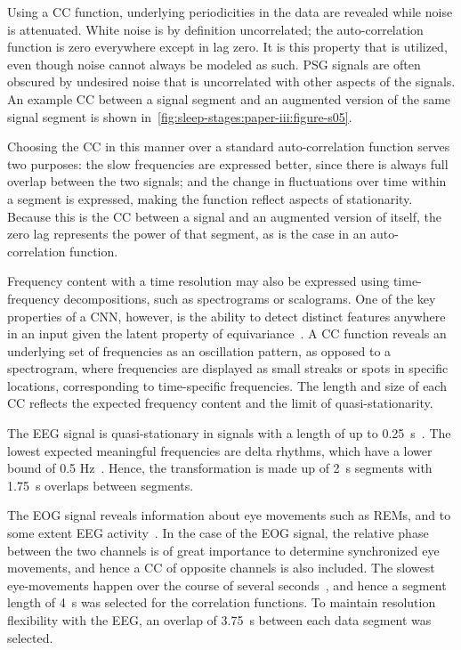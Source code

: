 Using a \ac{CC} function, underlying periodicities in the data are revealed while noise is attenuated. 
White noise is by definition uncorrelated; the auto-correlation function is zero everywhere except in lag zero. 
It is this property that is utilized, even though noise cannot always be modeled as such. 
\ac{PSG} signals are often obscured by undesired noise that is uncorrelated with other aspects of the signals. 
An example \ac{CC} between a signal segment and an augmented version of the same signal segment is shown in~\cref{fig:sleep-stages:paper-iii:figure-s05}. 

Choosing the \ac{CC} in this manner over a standard auto-correlation function serves two purposes: the slow frequencies are expressed better, since there is always full overlap between the two signals; and the change in fluctuations over time within a segment is expressed, making the function reflect aspects of stationarity. 
Because this is the \ac{CC} between a signal and an augmented version of itself, the zero lag represents the power of that segment, as is the case in an auto-correlation function.

Frequency content with a time resolution may also be expressed using time-frequency decompositions, such as spectrograms or scalograms.
One of the key properties of a \ac{CNN}, however, is the ability to detect distinct features anywhere in an input given the latent property of equivariance~\cite{Lenc2015}. 
A \ac{CC} function reveals an underlying set of frequencies as an oscillation pattern, as opposed to a spectrogram, where frequencies are displayed as small streaks or spots in specific locations, corresponding to time-specific frequencies.
The length and size of each \ac{CC} reflects the expected frequency content and the limit of quasi-stationarity.

The \ac{EEG} signal is quasi-stationary in signals with a length of up to \SI{0.25}{\second}~\cite{Amzica1998,Kaplan2005}.
The lowest expected meaningful frequencies are delta rhythms, which have a lower bound of 0.5 Hz~\cite{Amzica1998}. 
Hence, the transformation is made up of \SI{2}{\second} segments with \SI{1.75}{\second} overlaps between segments.

The \ac{EOG} signal reveals information about eye movements such as \acp{REM}, and to some extent \ac{EEG} activity~\cite{Malhotra2014, Berry2017}. 
In the case of the \ac{EOG} signal, the relative phase between the two channels is of great importance to determine synchronized eye movements, and hence a \ac{CC} of opposite channels is also included. 
The slowest eye-movements happen over the course of several seconds~\cite{Malhotra2014, Berry2017}, and hence a segment length of \SI{4}{\second} was selected for the correlation functions. 
To maintain resolution flexibility with the \ac{EEG}, an overlap of \SI{3.75}{\second} between each data segment was selected.


